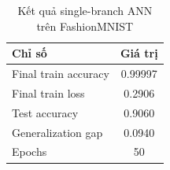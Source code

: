 \begin{table}[H]
\centering
\caption{Kết quả single-branch ANN trên FashionMNIST}
\label{tab:fashion-mnist-single-branch-results}
\begin{tabular}{l c}
\toprule
Chỉ số & Giá trị \\
\midrule
Final train accuracy & 0.99997 \\
Final train loss & 0.2906 \\
Test accuracy & 0.9060 \\
Generalization gap & 0.0940 \\
Epochs & 50 \\
\bottomrule
\end{tabular}
\end{table}
